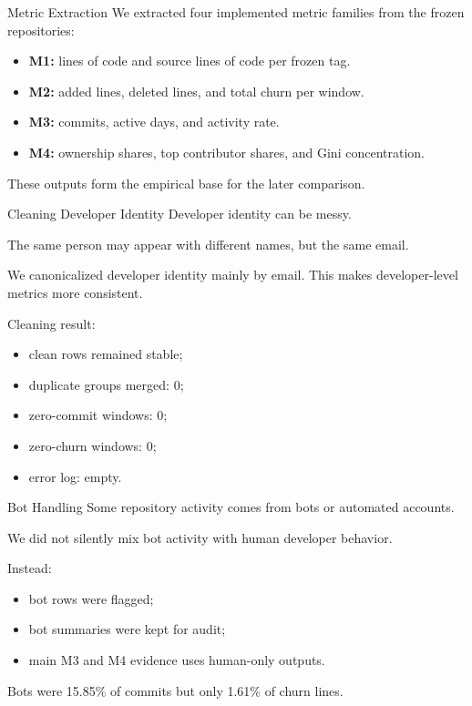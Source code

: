 \documentclass[aspectratio=169,11pt]{beamer}
\newcommand{\metric}[1]{\textbf{#1}}
\begin{document}
\begin{frame}{Metric Extraction}
  We extracted four implemented metric families from the frozen repositories:

  \begin{itemize}
    \item \metric{M1:} lines of code and source lines of code per frozen tag.
    \item \metric{M2:} added lines, deleted lines, and total churn per window.
    \item \metric{M3:} commits, active days, and activity rate.
    \item \metric{M4:} ownership shares, top contributor shares, and Gini concentration.
  \end{itemize}

  \vspace{0.3cm}
  These outputs form the empirical base for the later comparison.
\end{frame}

\begin{frame}{Cleaning Developer Identity}
  Developer identity can be messy.

  \vspace{0.2cm}
  The same person may appear with different names, but the same email.

  \vspace{0.3cm}
  We canonicalized developer identity mainly by email. This makes developer-level metrics more consistent.

  \vspace{0.3cm}
  Cleaning result:
  \begin{itemize}
    \item clean rows remained stable;
    \item duplicate groups merged: 0;
    \item zero-commit windows: 0;
    \item zero-churn windows: 0;
    \item error log: empty.
  \end{itemize}
\end{frame}

\begin{frame}{Bot Handling}
  Some repository activity comes from bots or automated accounts.

  \vspace{0.2cm}
  We did not silently mix bot activity with human developer behavior.

  \vspace{0.3cm}
  Instead:
  \begin{itemize}
    \item bot rows were flagged;
    \item bot summaries were kept for audit;
    \item main M3 and M4 evidence uses human-only outputs.
  \end{itemize}

  \vspace{0.3cm}
  Bots were 15.85\% of commits but only 1.61\% of churn lines.
\end{frame}
\end{document}
